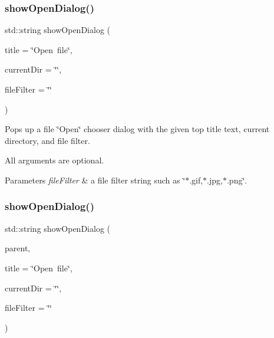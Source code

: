 \subsubsection{\texorpdfstring{show\+Open\+Dialog()}{showOpenDialog()}\hspace{0.1cm}{\footnotesize\ttfamily [1/3]}}
{\footnotesize\ttfamily std\+::string show\+Open\+Dialog (\begin{DoxyParamCaption}\item[{const std\+::string \&}]{title = {\ttfamily \char`\"{}Open~file\char`\"{}},  }\item[{const std\+::string \&}]{current\+Dir = {\ttfamily \char`\"{}\char`\"{}},  }\item[{const std\+::string \&}]{file\+Filter = {\ttfamily \char`\"{}\char`\"{}} }\end{DoxyParamCaption})\hspace{0.3cm}{\ttfamily [static]}}



Pops up a file \char`\"{}\+Open\char`\"{} chooser dialog with the given top title text, current directory, and file filter. 

All arguments are optional. 
\begin{DoxyParams}{Parameters}
{\em file\+Filter} & a file filter string such as \char`\"{}$\ast$.\+gif,$\ast$.\+jpg,$\ast$.\+png\char`\"{}. \\
\hline
\end{DoxyParams}
\mbox{\label{classGFileChooser_aceba7f99cdc44bebbb08a67a9ba32ab0}} 
\subsubsection{\texorpdfstring{show\+Open\+Dialog()}{showOpenDialog()}\hspace{0.1cm}{\footnotesize\ttfamily [2/3]}}
{\footnotesize\ttfamily std\+::string show\+Open\+Dialog (\begin{DoxyParamCaption}\item[{\mbox{\hyperlink{classGWindow}{G\+Window}} $\ast$}]{parent,  }\item[{const std\+::string \&}]{title = {\ttfamily \char`\"{}Open~file\char`\"{}},  }\item[{const std\+::string \&}]{current\+Dir = {\ttfamily \char`\"{}\char`\"{}},  }\item[{const std\+::string \&}]{file\+Filter = {\ttfamily \char`\"{}\char`\"{}} }\end{DoxyParamCaption})\hspace{0.3cm}{\ttfamily [static]}}



